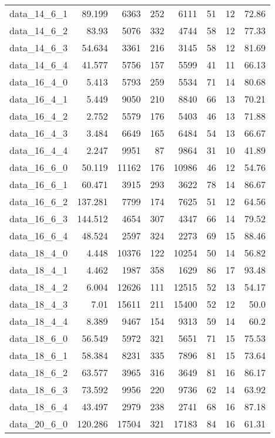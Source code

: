 \begin{tabular}{rrrrrrrr}
  data\_14\_6\_1 & 89.199 & 6363 & 252 & 6111 & 51 & 12 & 72.86 \\
  data\_14\_6\_2 & 83.93 & 5076 & 332 & 4744 & 58 & 12 & 77.33 \\
  data\_14\_6\_3 & 54.634 & 3361 & 216 & 3145 & 58 & 12 & 81.69 \\
  data\_14\_6\_4 & 41.577 & 5756 & 157 & 5599 & 41 & 11 & 66.13 \\
  data\_16\_4\_0 & 5.413 & 5793 & 259 & 5534 & 71 & 14 & 80.68 \\
  data\_16\_4\_1 & 5.449 & 9050 & 210 & 8840 & 66 & 13 & 70.21 \\
  data\_16\_4\_2 & 2.752 & 5579 & 176 & 5403 & 46 & 13 & 71.88 \\
  data\_16\_4\_3 & 3.484 & 6649 & 165 & 6484 & 54 & 13 & 66.67 \\
  data\_16\_4\_4 & 2.247 & 9951 & 87 & 9864 & 31 & 10 & 41.89 \\
  data\_16\_6\_0 & 50.119 & 11162 & 176 & 10986 & 46 & 12 & 54.76 \\
  data\_16\_6\_1 & 60.471 & 3915 & 293 & 3622 & 78 & 14 & 86.67 \\
  data\_16\_6\_2 & 137.281 & 7799 & 174 & 7625 & 51 & 12 & 64.56 \\
  data\_16\_6\_3 & 144.512 & 4654 & 307 & 4347 & 66 & 14 & 79.52 \\
  data\_16\_6\_4 & 48.524 & 2597 & 324 & 2273 & 69 & 15 & 88.46 \\
  data\_18\_4\_0 & 4.448 & 10376 & 122 & 10254 & 50 & 14 & 56.82 \\
  data\_18\_4\_1 & 4.462 & 1987 & 358 & 1629 & 86 & 17 & 93.48 \\
  data\_18\_4\_2 & 6.004 & 12626 & 111 & 12515 & 52 & 13 & 54.17 \\
  data\_18\_4\_3 & 7.01 & 15611 & 211 & 15400 & 52 & 12 & 50.0 \\
  data\_18\_4\_4 & 8.389 & 9467 & 154 & 9313 & 59 & 14 & 60.2 \\
  data\_18\_6\_0 & 56.549 & 5972 & 321 & 5651 & 71 & 15 & 75.53 \\
  data\_18\_6\_1 & 58.384 & 8231 & 335 & 7896 & 81 & 15 & 73.64 \\
  data\_18\_6\_2 & 63.577 & 3965 & 316 & 3649 & 81 & 16 & 86.17 \\
  data\_18\_6\_3 & 73.592 & 9956 & 220 & 9736 & 62 & 14 & 63.92 \\
  data\_18\_6\_4 & 43.497 & 2979 & 238 & 2741 & 68 & 16 & 87.18 \\
  data\_20\_6\_0 & 120.286 & 17504 & 321 & 17183 & 84 & 16 & 61.31 \\

\end{tabular}
